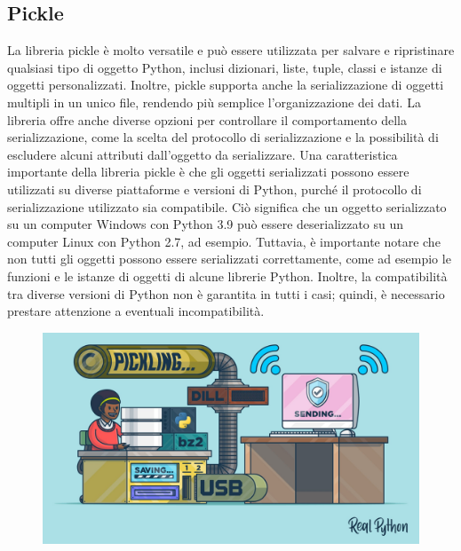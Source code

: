 \subsection{Pickle}
La libreria pickle è molto versatile e può essere utilizzata per salvare e ripristinare qualsiasi tipo di oggetto Python, inclusi dizionari, liste, tuple, classi e istanze di oggetti personalizzati. 
Inoltre, pickle supporta anche la serializzazione di oggetti multipli in un unico file, rendendo più semplice l'organizzazione dei dati. 
La libreria offre anche diverse opzioni per controllare il comportamento della serializzazione, come la scelta del protocollo di serializzazione e la possibilità di escludere alcuni attributi dall'oggetto da serializzare.
Una caratteristica importante della libreria pickle è che gli oggetti serializzati possono essere utilizzati su diverse piattaforme e versioni di Python, purché il protocollo di serializzazione utilizzato sia compatibile. 
Ciò significa che un oggetto serializzato su un computer Windows con Python 3.9 può essere deserializzato su un computer Linux con Python 2.7, ad esempio. 
Tuttavia, è importante notare che non tutti gli oggetti possono essere serializzati correttamente, come ad esempio le funzioni e le istanze di oggetti di alcune librerie Python. 
Inoltre, la compatibilità tra diverse versioni di Python non è garantita in tutti i casi; quindi, è necessario prestare attenzione a eventuali incompatibilità.

\begin{figure}
    \begin{center}    
        \includegraphics[width=0.9\linewidth]{images/image6.jpeg}
    \end{center}
\end{figure}

